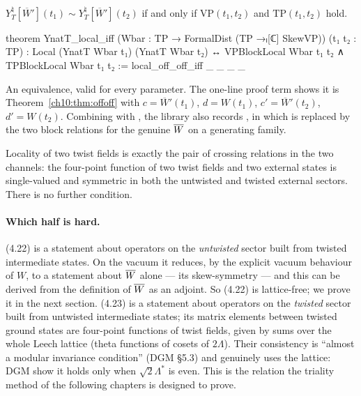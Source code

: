 \begin{theorem}\label{ch10:thm:ttiff}
$Y^\natural_T[\overline W'](t_1)\sim Y^\natural_T[\overline W'](t_2)$ if and only if
$\mathrm{VP}(t_1,t_2)$ and $\mathrm{TP}(t_1,t_2)$ hold.
\end{theorem}
\begin{leancode}
theorem YnatT_local_iff (Wbar : TP → FormalDist (TP →ₗ[ℂ] SkewVP)) (t₁ t₂ : TP) :
    Local (YnatT Wbar t₁) (YnatT Wbar t₂) ↔
      VPBlockLocal Wbar t₁ t₂ ∧ TPBlockLocal Wbar t₁ t₂ :=
  local_off_off_iff _ _ _ _
\end{leancode}
\begin{dictionary}
An equivalence, valid for every parameter.  The one-line proof term shows it is
Theorem~\ref{ch10:thm:offoff} with $c=\overline W'(t_1)$, $d=W(t_1)$, $c'=\overline W'(t_2)$,
$d'=W(t_2)$.  Combining with , the library also records
, in which  is replaced by the two block relations for
the genuine $\overline{W}$ on a generating family.
\end{dictionary}

\begin{physics}
Locality of two twist fields is exactly the pair of crossing relations in the two channels: the four-point function of two twist fields and two external states is single-valued and symmetric in both the untwisted and twisted external sectors. There is no further condition.
\end{physics}

\paragraph{Which half is hard.}  (4.22) is a statement about operators on the \emph{untwisted}
sector built from twisted intermediate states.  On the vacuum it reduces, by the explicit vacuum
behaviour of $W$, to a statement about $\overline{W}$ alone --- its skew-symmetry --- and this can be
derived from the definition of $\overline{W}$ as an adjoint.  So (4.22) is lattice-free; we prove it
in the next section.  (4.23) is a statement about operators on the \emph{twisted} sector built from
untwisted intermediate states; its matrix elements between twisted ground states are four-point
functions of twist fields, given by sums over the whole Leech lattice (theta functions of cosets
of $2\Lambda$).  Their consistency is ``almost a modular invariance condition'' (DGM §5.3) and
genuinely uses the lattice: DGM show it holds only when $\sqrt2\Lambda^*$ is even.  This is the
relation the triality method of the following chapters is designed to prove.

